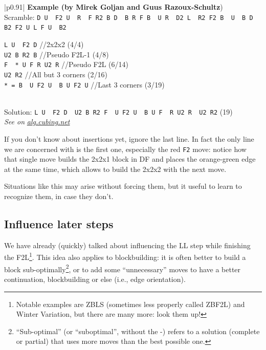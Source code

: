 \documentclass[11pt,a4paper]{book}
\newcommand{\p}{\textquotesingle}
\newcommand{\m}{\texttt}
\newcommand{\ps}{\p\,\,}
\newcommand{\comment}[1]{{\color{gray}\quad//#1}}
\begin{document}
\bigskip
\begin{tabular}{|p{}|}
\hline
\textbf{Example (by Mirek Goljan and Guus Razoux-Schultz})\\
\hline
Scramble: \m{D U\ps F2 U\ps R\ps F R2 B D\ps B R F B\ps U R\ps D2 L\ps R2 F2 B\ps U\ps B D B2 F2 U L F U\ps B2}\\
\hline
\begin{minipage}[l]{0.650\textwidth}
\m{L U\ps {\color{red}F2} D\p} \comment{2x2x2 (4/4)}\\
\m{U2 B R2 B} \comment{Pseudo F2L-1 (4/8)}\\
\m{F\ps * U F R U2 R\p} \comment{Pseudo F2L (6/14)}\\
\m{U2 R2} \comment{All but 3 corners (2/16)}\\
\m{* = B\ps U F2 U\ps B U F2 U\p} \comment{Last 3 corners (3/19)}
\end{minipage}
\begin{minipage}[c]{0.25\textwidth}

\end{minipage}\\
\hline
Solution: \m{L U\ps F2 D\ps U2 B R2 F\ps U F2 U\ps B U F\ps R U2 R\ps U2 R2} (19)\\
\hline
\emph{See on }\href{https://alg.cubing.net/?setup=D_U-_F2_U-_R-_F_R2_B_D-_B_R_F_B-_U_R-_D2_L-_R2_F2_B-_U-_B_D_B2_F2_U_L_F_U-_B2&alg=L_U-_F2_D-_\%2F\%2F2x2x2_(4\%2F4)\%0AU2_B_R2_B_\%2F\%2FPseudo_F2L\%26\%2345\%3B1_(4\%2F8)\%0AF-_(B-_U_F2_U-_B_U_F2_U-)_U_F_R_U2_R-_\%2F\%2FPseudo_F2L_(6\%2F14)\%0AU2_R2_\%2F\%2FAll_but_3_corners_(2\%2F16)}{\emph{alg.cubing.net}}\\
\hline
\end{tabular}
\bigskip

If you don't know about insertions yet, ignore the last line. In fact the only line we are concerned with is the first one, especially the red \m{F2} move: notice how that single move builds the 2x2x1 block in DF and places the orange-green edge at the same time, which allows to build the 2x2x2 with the next move.

Situations like this may arise without forcing them, but it useful to learn to recognize them, in case they don't.

\subsection{Influence later steps}

We have already (quickly) talked about influencing the LL step while finishing the F2L\footnote{Notable examples are ZBLS (sometimes less properly called ZBF2L) and Winter Variation, but there are many more: look them up!}. This idea also applies to blockbuilding: it is often better to build a block sub-optimally\footnote{``Sub-optimal'' (or ``suboptimal'', without the -) refers to a solution (complete or partial) that uses more moves than the best possible one.}, or to add some ``unnecessary'' moves to have a better continuation, blockbuilding or else (i.e., edge orientation).
\end{document}

